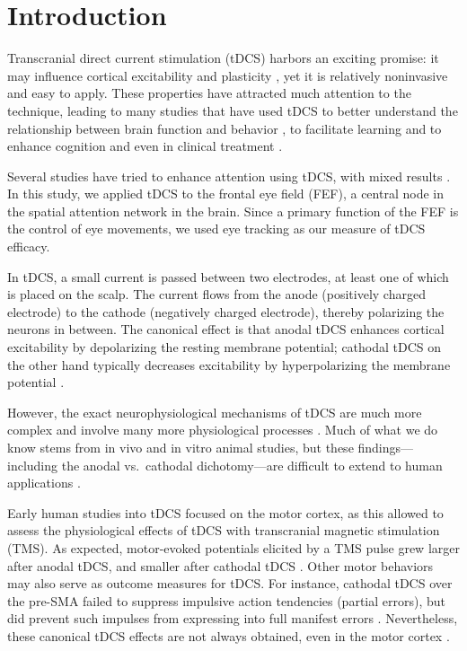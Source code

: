 \documentclass[11pt,]{memoir}
\begin{document}
\hypertarget{sacc_tDCS-introduction}{%
\section{Introduction}\label{sacc_tDCS-introduction}}

Transcranial direct current stimulation (tDCS) harbors an exciting promise: it may influence cortical excitability and plasticity \autocite{Yavari2018}, yet it is relatively noninvasive and easy to apply. These properties have attracted much attention to the technique, leading to many studies that have used tDCS to better understand the relationship between brain function and behavior \autocite{Filmer2014}, to facilitate learning and to enhance cognition \autocites{CohenKadosh2014}{Coffman2014} and even in clinical treatment \autocite{Lefaucheur2016}.

Several studies have tried to enhance attention using tDCS, with mixed results \autocite{Reteig2017}. In this study, we applied tDCS to the frontal eye field (FEF), a central node in the spatial attention network in the brain. Since a primary function of the FEF is the control of eye movements, we used eye tracking as our measure of tDCS efficacy.

In tDCS, a small current is passed between two electrodes, at least one of which is placed on the scalp. The current flows from the anode (positively charged electrode) to the cathode (negatively charged electrode), thereby polarizing the neurons in between. The canonical effect is that anodal tDCS enhances cortical excitability by depolarizing the resting membrane potential; cathodal tDCS on the other hand typically decreases excitability by hyperpolarizing the membrane potential \autocite{Nitsche2008}.

However, the exact neurophysiological mechanisms of tDCS are much more complex and involve many more physiological processes \autocites{Medeiros2012}{Jackson2016}. Much of what we do know stems from in vivo and in vitro animal studies, but these findings---including the anodal vs.~cathodal dichotomy---are difficult to extend to human applications \autocites{Fertonani2017}{Bestmann2014}.

Early human studies into tDCS focused on the motor cortex, as this allowed to assess the physiological effects of tDCS with transcranial magnetic stimulation (TMS). As expected, motor-evoked potentials elicited by a TMS pulse grew larger after anodal tDCS, and smaller after cathodal tDCS \autocites{Nitsche2000}{Nitsche2001}. Other motor behaviors may also serve as outcome measures for tDCS. For instance, cathodal tDCS over the pre-SMA failed to suppress impulsive action tendencies (partial errors), but did prevent such impulses from expressing into full manifest errors \autocite{Spieser2015}. Nevertheless, these canonical tDCS effects are not always obtained, even in the motor cortex \autocite{Strube2016}.
\end{document}
